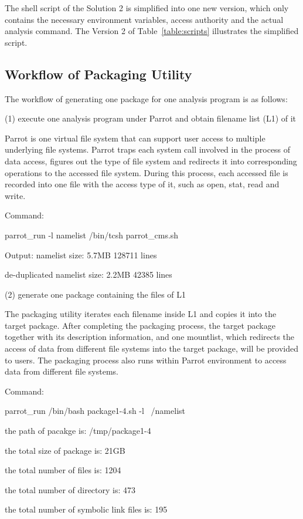 \documentclass{acm_proc_article-sp}
\begin{document}
The shell script of the Solution 2 is simplified into one new version, which only contains the necessary environment variables, access authority and the actual analysis command. The Version 2 of Table~\ref{table:scripts} illustrates the simplified script.

\subsection{Workflow of Packaging Utility}
The workflow of generating one package for one analysis program is as follows:

(1) execute one analysis program under Parrot and obtain filename list (L1) of it

Parrot is one virtual file system that can support user access to multiple underlying file systems. Parrot traps each system call involved in the process of data access, figures out the type of file system and redirects it into corresponding operations to the accessed file system. During this process, each accessed file is recorded into one file with the access type of it, such as open, stat, read and write.

Command:

parrot\_run -l namelist /bin/tcsh parrot\_cms.sh

Output:
namelist size: 5.7MB     128711 lines

de-duplicated namelist size: 2.2MB   42385 lines

(2) generate one package containing the files of L1 

The packaging utility iterates each filename inside L1 and copies it into the target package. After completing the packaging process, the target package together with its description information, and one mountlist, which redirects the access of data from different file systems into the target package, will be provided to users. The packaging process also runs within Parrot environment to access data from different file systems.

Command:

parrot\_run /bin/bash package1-4.sh -l ~/namelist

the path of pacakge is: /tmp/package1-4

the total size of package is: 21GB

the total number of files is: 1204

the total number of directory is: 473

the total number of symbolic link files is: 195
\end{document}

